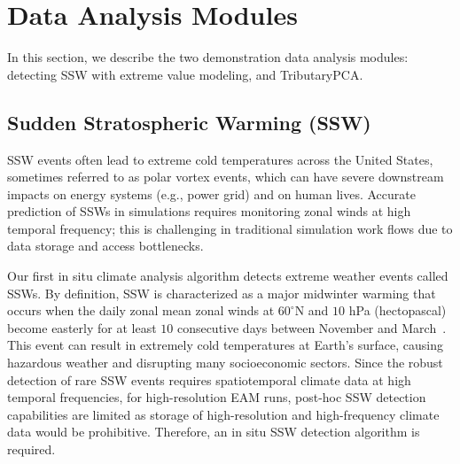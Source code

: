 \documentclass{juliacon}
\begin{document}
\section{Data Analysis Modules} \label{sec4}
In this section, we describe the two demonstration data analysis modules: detecting SSW with extreme value modeling, and TributaryPCA.

\subsection{Sudden Stratospheric Warming (SSW)}

SSW events often lead to extreme cold temperatures across the United States, sometimes referred to as polar vortex events, which can have severe downstream impacts on energy systems (e.g., power grid) and on human lives. Accurate prediction of SSWs in simulations requires monitoring zonal winds at high temporal frequency; this is challenging in traditional simulation work flows due to data storage and access bottlenecks.




Our first in situ climate analysis algorithm detects extreme weather events called SSWs. By definition, SSW is characterized as a major midwinter warming that occurs when the daily zonal mean zonal winds at $60^{\circ}$N and $10$ hPa (hectopascal) become easterly for at least $10$ consecutive days between November and March~\cite{ssw,ssw_def}. This event can result in extremely cold temperatures at Earth's surface, causing hazardous weather and disrupting many socioeconomic sectors. Since the robust detection of rare SSW events requires spatiotemporal climate data at high temporal frequencies, for high-resolution EAM runs, post-hoc SSW detection capabilities are limited as storage of high-resolution and high-frequency climate data would be prohibitive. Therefore, an in situ SSW detection algorithm is required.
\end{document}
